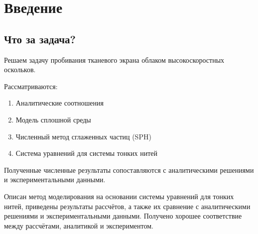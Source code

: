 \chapter{Введение}\label{ch:intro}

\section*{Что за задача?}

Решаем задачу пробивания тканевого экрана облаком высокоскоростных оскольков.

Рассматриваются:

\begin{enumerate}
    \item Аналитические соотношения
    \item Модель сплошной среды
    \item Численный метод сглаженных частиц (SPH)
    \item Система уравнений для системы тонких нитей
\end{enumerate}

Полученные численные результаты сопоставляются с аналитическими решениями и экспериментальными данными.

Описан метод моделирования на основании системы уравнений для тонких нитей,
приведены результаты рассчётов, а также  их сравнение с аналитическими решениями и экспериментальными данными.
Получено хорошее соответствие между рассчётами, аналитикой и экспериментом.
